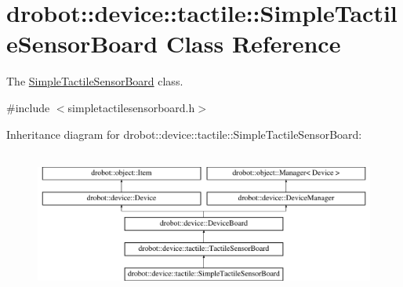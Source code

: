 \hypertarget{classdrobot_1_1device_1_1tactile_1_1SimpleTactileSensorBoard}{\section{drobot\-:\-:device\-:\-:tactile\-:\-:Simple\-Tactile\-Sensor\-Board Class Reference}
\label{classdrobot_1_1device_1_1tactile_1_1SimpleTactileSensorBoard}
}


The \hyperlink{classdrobot_1_1device_1_1tactile_1_1SimpleTactileSensorBoard}{Simple\-Tactile\-Sensor\-Board} class.  




{\ttfamily \#include $<$simpletactilesensorboard.\-h$>$}

Inheritance diagram for drobot\-:\-:device\-:\-:tactile\-:\-:Simple\-Tactile\-Sensor\-Board\-:\begin{figure}[H]
\begin{center}
\leavevmode
\includegraphics[height=4.778157cm]{classdrobot_1_1device_1_1tactile_1_1SimpleTactileSensorBoard}
\end{center}
\end{figure}
